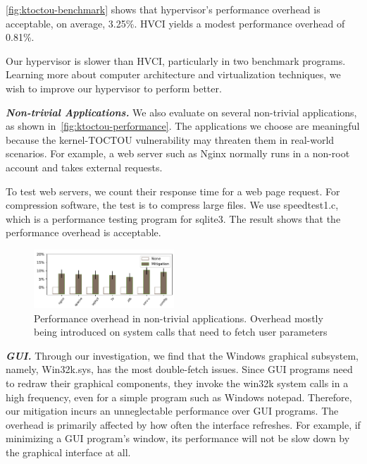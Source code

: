 \autoref{fig:ktoctou-benchmark} shows that hypervisor's performance overhead is acceptable, on average, 3.25\%. HVCI yields a modest performance overhead of 0.81\%.


Our hypervisor is slower than HVCI, particularly in two benchmark programs. Learning more about computer architecture and virtualization techniques, we wish to improve our hypervisor to perform better.


\textbf{\textit{Non-trivial Applications.}} We also evaluate \name on several non-trivial applications, as shown in~\autoref{fig:ktoctou-performance}. The applications we choose are meaningful because the kernel-TOCTOU vulnerability may threaten them in real-world scenarios. For example, a web server such as Nginx normally runs in a non-root account and takes external requests.

To test web servers, we count their response time for a web page request. For compression software, the test is to compress large files. We use speedtest1.c, which is a performance testing program for sqlite3. The result shows that the performance overhead is acceptable.

\begin{figure}[th]
  \includegraphics[width=0.47\textwidth]{figures/performance4}
  \centering
  \caption{Performance overhead in non-trivial applications. Overhead mostly being introduced on system calls that need to fetch user parameters}
  \label{fig:ktoctou-performance}
\end{figure}





\textbf{\textit{GUI.}} Through our investigation, we find that the Windows graphical subsystem, namely, Win32k.sys, has the most double-fetch issues.  Since GUI programs need to redraw their graphical components, they invoke the win32k system calls in a high frequency, even for a simple program such as Windows notepad. Therefore,  our mitigation incurs an unneglectable performance over GUI programs. The overhead is primarily affected by how often the interface refreshes. For example, if minimizing a GUI program's window, its performance will not be slow down by the graphical interface at all. 

